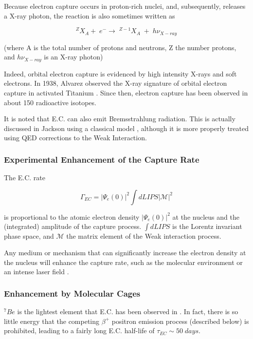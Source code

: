 \documentclass[%
 aip,
 jmp,%
 amsmath,amssymb,
 reprint,%
]{revtex4-1}
\begin{document}
Because electron capture occurs in proton-rich nuclei, and, subsequently, releases a X-ray photon, the reaction is also sometimes written as

$$^{Z}X_{A}+\;e^{-}\rightarrow\;^{Z-1}X_{A}\;+\;h\nu_{X-ray}$$

(where A is the total number of protons and neutrons, Z the number protons, and $h\nu_{X-ray}$ is an X-ray photon)

Indeed, orbital electron capture is evidenced by high intensity X-rays and soft electrons.  In 1938, Alvarez observed the X-ray signature of orbital electron capture in activated Titanium \cite{alvarez}. Since then, electron capture has been observed in about 150 radioactive isotopes.

It is noted that E.C. can also emit Bremsstrahlung radiation.  This is actually discussed in Jackson using a classical model \cite{jackson}, although it is more properly treated using QED corrections to the Weak Interaction\cite{Jauch}.  

\subsubsection{Experimental Enhancement of the Capture Rate}

The E.C. rate 

$$\Gamma_{EC}=\big\vert\Psi_{e}(0)\big\vert^{2}\int dLIPS\big\vert\mathcal{M}\big\vert^{2}$$

is proportional to the atomic electron density  $\big\vert\Psi_{e}(0)\big\vert^{2}$  at the nucleus and the (integrated) amplitude of the capture process.
$\int dLIPS$ is the Lorentz invariant phase space,  and $\mathcal{M}$  the matrix element of the Weak interaction process.

Any medium or mechanism that can significantly increase the electron density at the nucleus will enhance the capture rate, such as the molecular environment \cite{ohtsuki} or an intense laser field \cite{sato}.

\subsubsection{Enhancement by Molecular Cages}

$^{7}Be$ is the  lightest element that E.C. has been observed in \cite{radbookbahcall}. In fact, there is so little energy that the competing $\beta^{+}$ positron emission process (described below) is prohibited, leading to a fairly long E.C. half-life of $\tau_{EC}\sim 50\;days$.
\end{document}
